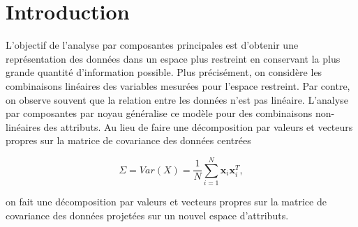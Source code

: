 \section{Introduction}


L'objectif de l'analyse par composantes principales est d'obtenir une représentation des données dans un espace plus restreint en conservant la plus grande quantité d'information possible. Plus précisément, on considère les combinaisons linéaires des variables mesurées pour l'espace restreint. Par contre, on observe souvent que la relation entre les données n'est pas linéaire. L'analyse par composantes par noyau généralise ce modèle pour des combinaisons non-linéaires des attributs. Au lieu de faire une décomposition par valeurs et vecteurs propres sur la matrice de covariance des données centrées

$$\Sigma = Var(X) = \frac{1}{N} \sum_{i = 1}^{N}   \textbf{x}_i\textbf{x}_i^{T},$$

on fait une décomposition par valeurs et vecteurs propres sur la matrice de covariance des données projetées sur un nouvel espace d'attributs.
